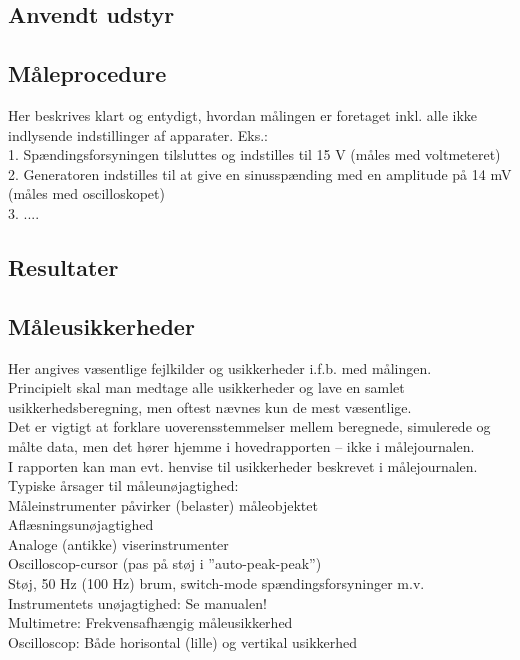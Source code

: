 \subsection*{Anvendt udstyr}



\subsection*{Måleprocedure}
Her beskrives klart og entydigt, hvordan målingen er foretaget inkl. alle ikke indlysende indstillinger af apparater. Eks.: \\
1. Spændingsforsyningen tilsluttes og indstilles til 15 V (måles med voltmeteret) \\
2. Generatoren indstilles til at give en sinusspænding med en amplitude på 14 mV (måles med oscilloskopet) \\
3. ....\\

\subsection*{Resultater}



\subsection*{Måleusikkerheder}
Her angives væsentlige fejlkilder og usikkerheder i.f.b. med målingen. \\
Principielt skal man medtage alle usikkerheder og lave en samlet usikkerhedsberegning, men oftest nævnes kun de mest væsentlige. \\
Det er vigtigt at forklare uoverensstemmelser mellem beregnede, simulerede og målte data, men det hører hjemme i hovedrapporten – ikke i målejournalen. \\
I rapporten kan man evt. henvise til usikkerheder beskrevet i målejournalen.\\
Typiske årsager til måleunøjagtighed:\\
Måleinstrumenter påvirker (belaster) måleobjektet\\
Aflæsningsunøjagtighed\\
Analoge (antikke) viserinstrumenter	\\
Oscilloscop-cursor (pas på støj i ”auto-peak-peak”)\\
Støj, 50 Hz (100 Hz) brum, switch-mode spændingsforsyninger m.v.\\
Instrumentets unøjagtighed: Se manualen! \\
Multimetre: Frekvensafhængig måleusikkerhed \\
Oscilloscop: Både horisontal (lille) og vertikal usikkerhed\\

